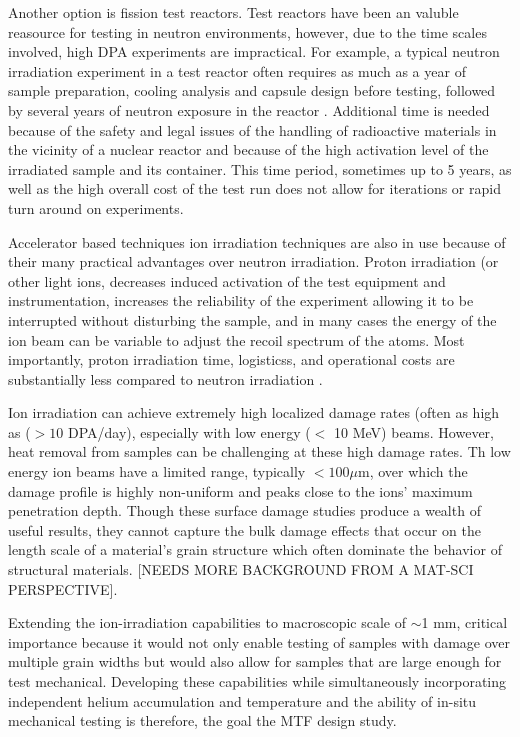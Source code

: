 \documentclass[final,3p,times,twocolumn]{elsarticle} %
\begin{document}
Another option is fission test reactors.  Test reactors have been an valuble reasource for testing in neutron environments, however, due to the time scales involved, high DPA experiments are impractical.  For example, a typical neutron irradiation experiment in a test reactor often requires as much as a year of sample preparation, cooling analysis and capsule design before testing, followed by several years of neutron exposure in the reactor \cite{sickafus2007radiation}. Additional time is needed because of the safety and legal issues of the handling of radioactive materials in the vicinity of a nuclear reactor and because of the high activation level of the irradiated sample and its container. This time period, sometimes up to 5 years, as well as the high overall cost of the test run does not allow for iterations or rapid turn around on experiments. %

Accelerator based techniques ion irradiation techniques are also in use because of their many practical advantages over neutron irradiation.  Proton irradiation (or other light ions, decreases induced activation of the test equipment and instrumentation, increases the reliability of the experiment allowing it to be interrupted without disturbing the sample, and in many cases the energy of the ion beam can be variable to adjust the recoil spectrum of the atoms. Most importantly, proton irradiation time, logisticss, and operational costs are substantially less compared to neutron irradiation \cite{Was}.

Ion irradiation can achieve extremely high localized damage rates (often as high as ($>10$ DPA/day), especially with low energy ($<$ 10 MeV) beams.  However, heat removal from samples can be challenging at these high damage rates.  Th low energy ion beams have a limited range, typically $<100\mu$m, over which the damage profile is highly non-uniform and peaks close to the ions' maximum penetration depth.  Though these surface damage studies produce a wealth of useful results, they cannot capture the bulk damage effects that occur on the length scale of a material's grain structure which often dominate the behavior of structural materials. [NEEDS MORE BACKGROUND FROM A MAT-SCI PERSPECTIVE].

Extending the ion-irradiation capabilities to macroscopic scale of $\sim$1 mm, critical importance because it would not only enable testing of samples with damage over multiple grain widths but would also allow for samples that are large enough for test mechanical.  Developing these capabilities while simultaneously incorporating independent helium accumulation and temperature and the ability of in-situ mechanical testing is therefore, the goal the MTF design study.  
\end{document}
